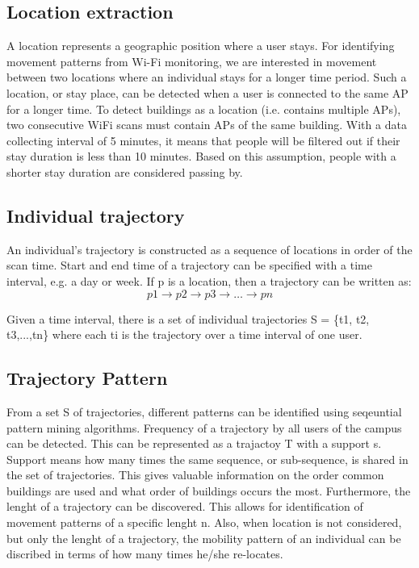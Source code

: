 \subsection{Location extraction}
A location represents a geographic position where a user stays. For identifying movement patterns from Wi-Fi monitoring, we are interested in movement between two locations where an individual stays for a longer time period. Such a location, or stay place, can be detected when a user is connected to the same AP for a longer time. To detect  buildings as a location (i.e. contains multiple APs), two consecutive WiFi scans must contain  APs of the same building. With a data collecting interval of 5 minutes, it means that people will be filtered out if their stay duration is less than 10 minutes. Based on this assumption, people with a shorter stay duration are considered passing by.

\subsection{Individual trajectory}
An individual’s trajectory is constructed as a sequence of locations in order of the scan time. Start and end time of a trajectory can be specified with a time interval, e.g. a day or week. If p is a location, then a trajectory can be written as:
$$p1 \rightarrow p2 \rightarrow p3 \rightarrow …\rightarrow pn$$

Given a time interval, there is a set of individual trajectories S = \{t1, t2, t3,...,tn\} where each ti is the trajectory over a time interval of one user. 

\subsection{Trajectory Pattern}
From a set S of trajectories, different patterns can be identified using seqeuntial pattern mining algorithms. Frequency of a trajectory by all users of the campus can be detected. This can be represented as a trajactoy T with a support s. Support means how many times the same sequence, or sub-sequence, is shared in the set of trajectories. This gives valuable information on the order common buildings are used and what order of buildings occurs the most. Furthermore, the lenght of a trajectory can be discovered. This allows for identification of movement patterns of a specific lenght n. Also, when location is not considered, but only the lenght of a trajectory, the mobility pattern of an individual can be discribed in terms of how many times he/she re-locates. 
